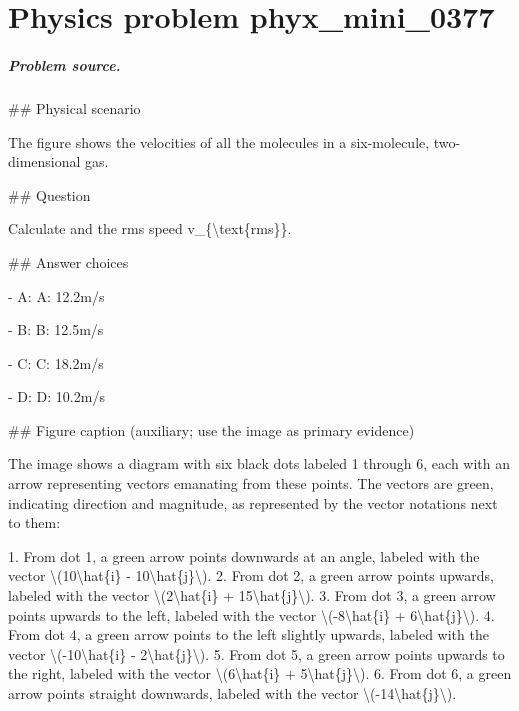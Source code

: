 
\chapter{Physics problem phyx\_mini\_0377}
\label{ch:PhyXMiniProblems_problem_phyx_mini_0377}

\paragraph{Problem source.}
\#\# Physical scenario

The figure shows the velocities of all the molecules in a six-molecule, two-dimensional gas.

\#\# Question

Calculate and the rms speed v\_\{\textbackslash{}text\{rms\}\}.

\#\# Answer choices

- A: A: 12.2m/s

- B: B: 12.5m/s

- C: C: 18.2m/s

- D: D: 10.2m/s

\#\# Figure caption (auxiliary; use the image as primary evidence)

The image shows a diagram with six black dots labeled 1 through 6, each with an arrow representing vectors emanating from these points. The vectors are green, indicating direction and magnitude, as represented by the vector notations next to them:

1. From dot 1, a green arrow points downwards at an angle, labeled with the vector \textbackslash{}(10\textbackslash{}hat\{i\} - 10\textbackslash{}hat\{j\}\textbackslash{}).
2. From dot 2, a green arrow points upwards, labeled with the vector \textbackslash{}(2\textbackslash{}hat\{i\} + 15\textbackslash{}hat\{j\}\textbackslash{}).
3. From dot 3, a green arrow points upwards to the left, labeled with the vector \textbackslash{}(-8\textbackslash{}hat\{i\} + 6\textbackslash{}hat\{j\}\textbackslash{}).
4. From dot 4, a green arrow points to the left slightly upwards, labeled with the vector \textbackslash{}(-10\textbackslash{}hat\{i\} - 2\textbackslash{}hat\{j\}\textbackslash{}).
5. From dot 5, a green arrow points upwards to the right, labeled with the vector \textbackslash{}(6\textbackslash{}hat\{i\} + 5\textbackslash{}hat\{j\}\textbackslash{}).
6. From dot 6, a green arrow points straight downwards, labeled with the vector \textbackslash{}(-14\textbackslash{}hat\{j\}\textbackslash{}).

